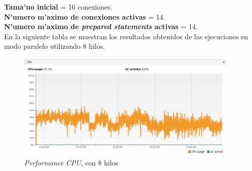 \textbf{Tama'no inicial} = 16 conexiones. \\
\textbf{N'umero m'aximo de conexiones activas} = 14. \\
\textbf{N'umero m'aximo de \emph{prepared statements} activas} = 14. \\

En la siguiente tabla se muestran los resultados obtenidos de las ejecuciones en modo paralelo utilizando 8 hilos. \\

\begin{table}[H]
\begin{center}
\end{center}
\caption{Resultados en modo paralelo con 8 hilos}
\end{table}

\begin{figure}[H]
\centering
\includegraphics[width=0.95\textwidth]{images/Performance_CPU_8_Threads}
\caption{\emph{Performance CPU}, con 8 hilos}
\label{fig:6.13}
\end{figure}

